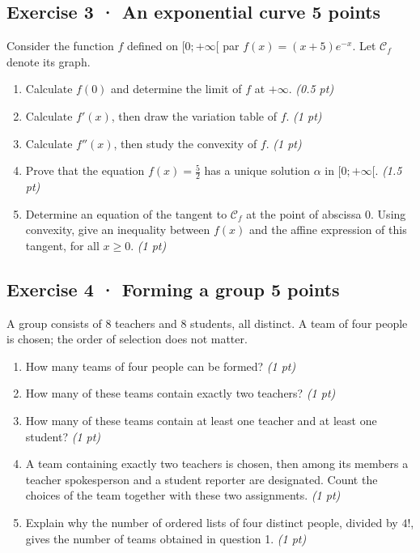 \clearpage{}\par

\subsection*{Exercise 3 · An exponential curve \hfill 5 points}Consider the function $f$ defined on $[0;+\infty[$ par $f(x)=(x+5)e^{-x}$. Let $\mathcal C_f$ denote its graph.

\begin{enumerate}

\item Calculate $f(0)$ and determine the limit of $f$ at $+\infty$. \hfill\textit{(0.5 pt)}

\item Calculate $f'(x)$, then draw the variation table of $f$. \hfill\textit{(1 pt)}

\item Calculate $f''(x)$, then study the convexity of $f$. \hfill\textit{(1 pt)}

\item Prove that the equation $f(x)=\frac{5}{2}$ has a unique solution $\alpha$ in $[0;+\infty[$. \hfill\textit{(1.5 pt)}

\item Determine an equation of the tangent to $\mathcal C_f$ at the point of abscissa $0$. Using convexity, give an inequality between $f(x)$ and the affine expression of this tangent, for all $x\ge0$. \hfill\textit{(1 pt)}

\end{enumerate}

\subsection*{Exercise 4 · Forming a group \hfill 5 points}A group consists of $8$ teachers and $8$ students, all distinct. A team of four people is chosen; the order of selection does not matter.

\begin{enumerate}

\item How many teams of four people can be formed? \hfill\textit{(1 pt)}

\item How many of these teams contain exactly two teachers? \hfill\textit{(1 pt)}

\item How many of these teams contain at least one teacher and at least one student? \hfill\textit{(1 pt)}

\item A team containing exactly two teachers is chosen, then among its members a teacher spokesperson and a student reporter are designated. Count the choices of the team together with these two assignments. \hfill\textit{(1 pt)}

\item Explain why the number of ordered lists of four distinct people, divided by $4!$, gives the number of teams obtained in question 1. \hfill\textit{(1 pt)}

\end{enumerate}

